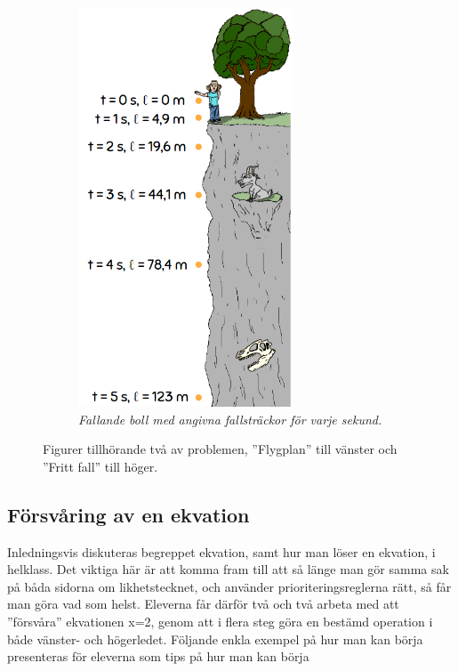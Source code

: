 \begin{figure}
\begin{subfigure}[b]{0.45\textwidth}
        \includegraphics[width=0.7\textwidth]{Figures/FrittFall.PNG}
        \caption{\textsl{Fallande boll med angivna fallsträckor för varje sekund.}}
        \label{fig:FrittFall}
    \end{subfigure}
    \hspace{0.4cm}
    \caption{Figurer tillhörande två av problemen, ''Flygplan'' till vänster och ''Fritt fall'' till höger.}
    \label{fig:three graphs}
\end{figure}
    
    
    
\subsection{Försvåring av en ekvation}
    \label{sec:ekvation}

    \textcolor{lila}{Inledningsvis diskuteras begreppet ekvation, samt hur man löser en ekvation, i helklass. Det viktiga här är att komma fram till att så länge man gör samma sak på båda sidorna om likhetstecknet, och använder prioriteringsreglerna rätt, så får man göra vad som helst. Eleverna får därför två och två arbeta med att ''försvåra'' ekvationen x=2, genom att i flera steg göra en bestämd operation i både vänster- och högerledet. Följande enkla exempel på hur man kan börja presenteras för eleverna som tips på hur man kan börja}
    
